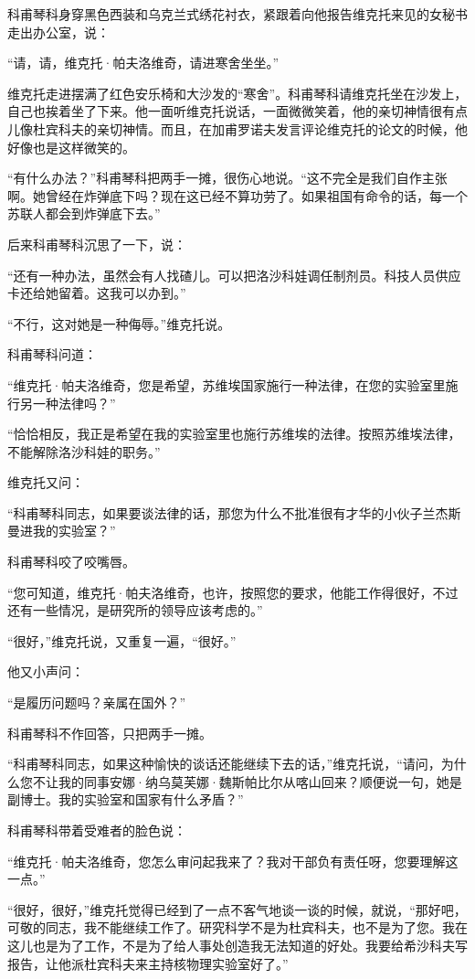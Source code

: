 科甫琴科身穿黑色西装和乌克兰式绣花衬衣，紧跟着向他报告维克托来见的女秘书走出办公室，说：

“请，请，维克托·帕夫洛维奇，请进寒舍坐坐。”

维克托走进摆满了红色安乐椅和大沙发的“寒舍”。科甫琴科请维克托坐在沙发上，自己也挨着坐了下来。他一面听维克托说话，一面微微笑着，他的亲切神情很有点儿像杜宾科夫的亲切神情。而且，在加甫罗诺夫发言评论维克托的论文的时候，他好像也是这样微笑的。

“有什么办法？”科甫琴科把两手一摊，很伤心地说。“这不完全是我们自作主张啊。她曾经在炸弹底下吗？现在这已经不算功劳了。如果祖国有命令的话，每一个苏联人都会到炸弹底下去。”

后来科甫琴科沉思了一下，说：

“还有一种办法，虽然会有人找碴儿。可以把洛沙科娃调任制剂员。科技人员供应卡还给她留着。这我可以办到。”

“不行，这对她是一种侮辱。”维克托说。

科甫琴科问道：

“维克托·帕夫洛维奇，您是希望，苏维埃国家施行一种法律，在您的实验室里施行另一种法律吗？”

“恰恰相反，我正是希望在我的实验室里也施行苏维埃的法律。按照苏维埃法律，不能解除洛沙科娃的职务。”

维克托又问：

“科甫琴科同志，如果要谈法律的话，那您为什么不批准很有才华的小伙子兰杰斯曼进我的实验室？”

科甫琴科咬了咬嘴唇。

“您可知道，维克托·帕夫洛维奇，也许，按照您的要求，他能工作得很好，不过还有一些情况，是研究所的领导应该考虑的。”

“很好，”维克托说，又重复一遍，“很好。”

他又小声问：

“是履历问题吗？亲属在国外？”

科甫琴科不作回答，只把两手一摊。

“科甫琴科同志，如果这种愉快的谈话还能继续下去的话，”维克托说，“请问，为什么您不让我的同事安娜·纳乌莫芙娜·魏斯帕比尔从喀山回来？顺便说一句，她是副博士。我的实验室和国家有什么矛盾？”

科甫琴科带着受难者的脸色说：

“维克托·帕夫洛维奇，您怎么审问起我来了？我对干部负有责任呀，您要理解这一点。”

“很好，很好，”维克托觉得已经到了一点不客气地谈一谈的时候，就说，“那好吧，可敬的同志，我不能继续工作了。研究科学不是为杜宾科夫，也不是为了您。我在这儿也是为了工作，不是为了给人事处创造我无法知道的好处。我要给希沙科夫写报告，让他派杜宾科夫来主持核物理实验室好了。”

